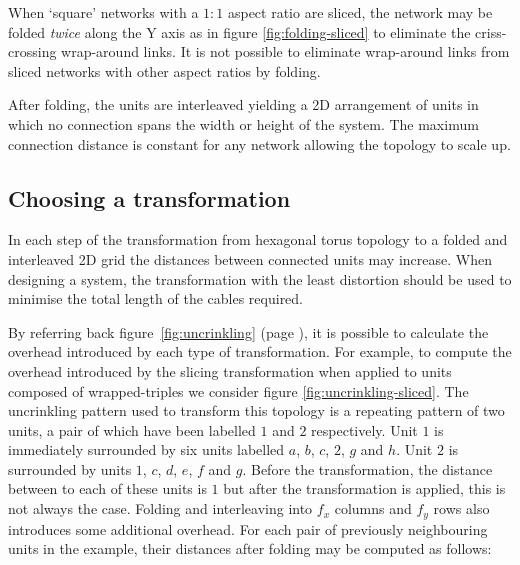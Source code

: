 			When `square' networks with a $1:1$ aspect ratio are sliced, the network
			may be folded \emph{twice} along the Y axis as in figure
			\ref{fig:folding-sliced} to eliminate the criss-crossing
			wrap-around links. It is not possible to eliminate wrap-around links from
			sliced networks with other aspect ratios by folding.
			
			After folding, the units are interleaved yielding a 2D arrangement of
			units in which no connection spans the width or height of the system. The
			maximum connection distance is constant for any network allowing the
			topology to scale up.
		
		\subsection{Choosing a transformation}
			
			\label{sec:distortion}
			
			In each step of the transformation from hexagonal torus topology to a
			folded and interleaved 2D grid the distances between connected units may
			increase. When designing a system, the transformation with the least
			distortion should be used to minimise the total length of the
			cables required.
			
			By referring back figure~\ref{fig:uncrinkling} (page
			\pageref{fig:uncrinkling}), it is possible to calculate the overhead
			introduced by each type of transformation.  For example, to compute the
			overhead introduced by the slicing transformation when applied to units
			composed of wrapped-triples we consider figure
			\ref{fig:uncrinkling-sliced}. The uncrinkling pattern used to transform
			this topology is a repeating pattern of two units, a pair of which have
			been labelled $1$ and $2$ respectively. Unit $1$ is immediately
			surrounded by six units labelled $a$, $b$, $c$, $2$, $g$ and $h$. Unit
			$2$ is surrounded by units $1$, $c$, $d$, $e$, $f$ and $g$. Before the
			transformation, the distance between to each of these units is $1$ but
			after the transformation is applied, this is not always the case. Folding
			and interleaving into $f_x$ columns and $f_y$ rows also introduces some
			additional overhead. For each pair of previously neighbouring units in
			the example, their distances after folding may be computed as follows:
			
